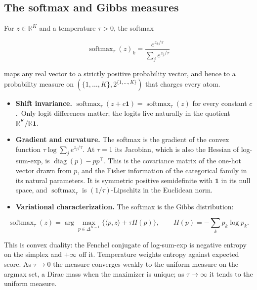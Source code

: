 \subsection{The softmax and Gibbs
measures}\label{sec:math:I7}

For \(z \in \mathbb{R}^{K}\) and a temperature \(\tau > 0\), the
softmax

\[
\operatorname{softmax}_\tau(z)_k = \frac{e^{z_k/\tau}}{\sum_j e^{z_j/\tau}}
\]

maps any real vector to a strictly positive probability vector, and
hence to a probability measure on \((\{1, \ldots, K\},
2^{\{1,\ldots,K\}})\) that charges every atom.

\begin{itemize}
\tightlist
\item
  \textbf{Shift invariance.} \(\operatorname{softmax}_\tau(z + c\mathbf{1}) =
  \operatorname{softmax}_\tau(z)\) for every constant \(c\).~Only logit differences matter; the
  logits live naturally in the quotient
  \(\mathbb{R}^{K}/\mathbb{R}\mathbf{1}\).
\item
  \textbf{Gradient and curvature.} The softmax is the gradient of the
  convex function \(\tau \log \sum_j e^{z_j/\tau}\). At \(\tau = 1\) its Jacobian, which
  is also the Hessian of log-sum-exp, is \(\operatorname{diag}(p) - pp^{\top}\). This
  is the covariance matrix of the one-hot vector drawn from \(p\), and the
  Fisher information of the categorical family in its natural
  parameters. It is symmetric positive semidefinite with \(\mathbf{1}\)
  in its null space, and \(\operatorname{softmax}_\tau\) is \((1/\tau)\)-Lipschitz in the Euclidean
  norm.
\item
  \textbf{Variational characterization.} The softmax is the Gibbs
  distribution:
\end{itemize}

\[
\operatorname{softmax}_\tau(z) = \arg\max_{p \in \Delta^{K-1}} \big\{ \langle p, z \rangle + \tau H(p) \big\}, \qquad H(p) = -\sum_k p_k \log p_k.
\]

This is convex duality: the Fenchel conjugate of log-sum-exp is negative
entropy on the simplex and \(+\infty\) off it. Temperature weights entropy
against expected score. As \(\tau \to 0\) the measure converges weakly to the
uniform measure on the argmax set, a Dirac mass when the maximizer is
unique; as \(\tau \to \infty\) it tends to the uniform measure.

